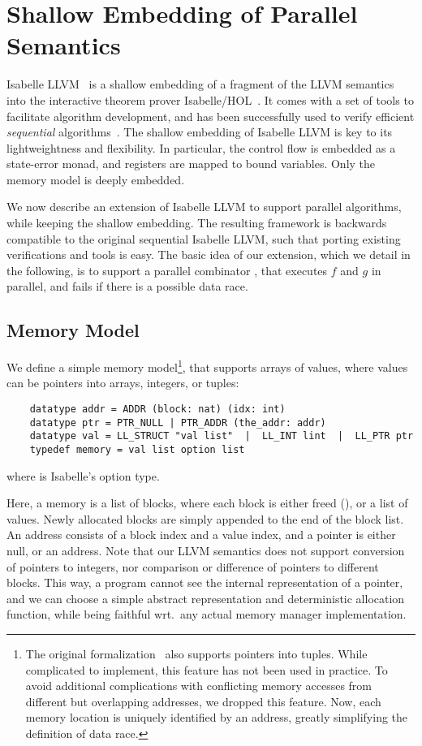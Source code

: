 \documentclass[runningheads]{llncs}
\begin{document}
\section{Shallow Embedding of Parallel Semantics}\label{sec:parsem}
  Isabelle LLVM~\cite{La19-llvm} is a shallow embedding of a fragment of the LLVM semantics into the interactive theorem prover Isabelle/HOL~\cite{NPW02}.
  It comes with a set of tools to facilitate algorithm development, and has been successfully used to verify efficient \emph{sequential} algorithms~\cite{La20}.
  The shallow embedding of Isabelle LLVM is key to its lightweightness and flexibility. In particular, the control flow is embedded as a state-error monad,
  and registers are mapped to bound variables. Only the memory model is deeply embedded.

  We now describe an extension of Isabelle LLVM to support parallel algorithms,
  while keeping the shallow embedding. The resulting framework is backwards compatible to the
  original sequential Isabelle LLVM, such that porting existing verifications and tools is easy.
  The basic idea of our extension, which we detail in the following, is to support a parallel
  combinator , that executes \is$f$ and \is$g$ in parallel, and fails if there is a possible data race.

  \subsection{Memory Model}
  We define a simple memory model\footnote{The original formalization~\cite{La19-llvm} also supports pointers into tuples.
  While complicated to implement, this feature has not been used in practice. To avoid additional complications
  with conflicting memory accesses from different but overlapping addresses, we dropped this feature.
  Now, each memory location is uniquely identified by an address, greatly simplifying the definition of data race.},
  that supports arrays of values, where values can be pointers into arrays, integers, or tuples:
  \begin{lstlisting}
    datatype addr = ADDR (block: nat) (idx: int)
    datatype ptr = PTR_NULL | PTR_ADDR (the_addr: addr)
    datatype val = LL_STRUCT "val list"  |  LL_INT lint  |  LL_PTR ptr
    typedef memory = val list option list
  \end{lstlisting}
  where  is Isabelle's option type.

  Here, a memory is a list of blocks, where each block is either freed (), or a list of values.
  Newly allocated blocks are simply appended to the end of the block list.
  An address consists of a block index and a value index, and a pointer is either null, or an address.
  Note that our LLVM semantics does not support conversion of pointers to integers, nor comparison
  or difference of pointers to different blocks. This way, a program cannot see the internal representation of a pointer,
  and we can choose a simple abstract representation and deterministic allocation function, while being
  faithful wrt.\ any actual memory manager implementation.
\end{document}
